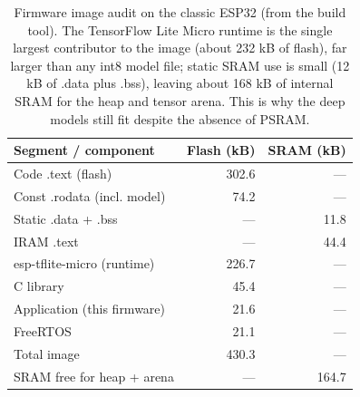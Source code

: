 \begin{table}[t]
\centering
\caption{Firmware image audit on the classic ESP32 (from the build tool). The TensorFlow Lite
Micro runtime is the single largest contributor to the image (about 232 kB of flash), far larger
than any int8 model file; static SRAM use is small (12 kB of .data plus .bss), leaving about 168 kB
of internal SRAM for the heap and tensor arena. This is why the deep models still fit despite the
absence of PSRAM.}
\label{tab:firmware-audit}
\begin{tabular}{lrr}
\hline
Segment / component & Flash (kB) & SRAM (kB) \\
\hline
Code .text (flash)        & 302.6 & --- \\
Const .rodata (incl. model) & 74.2 & --- \\
Static .data + .bss         & --- & 11.8 \\
IRAM .text                  & --- & 44.4 \\
\hline
esp-tflite-micro (runtime)  & 226.7 & --- \\
C library                   & 45.4  & --- \\
Application (this firmware)  & 21.6  & --- \\
FreeRTOS                    & 21.1  & --- \\
\hline
Total image                 & 430.3 & --- \\
SRAM free for heap + arena  & --- & 164.7 \\
\hline
\end{tabular}
\end{table}

